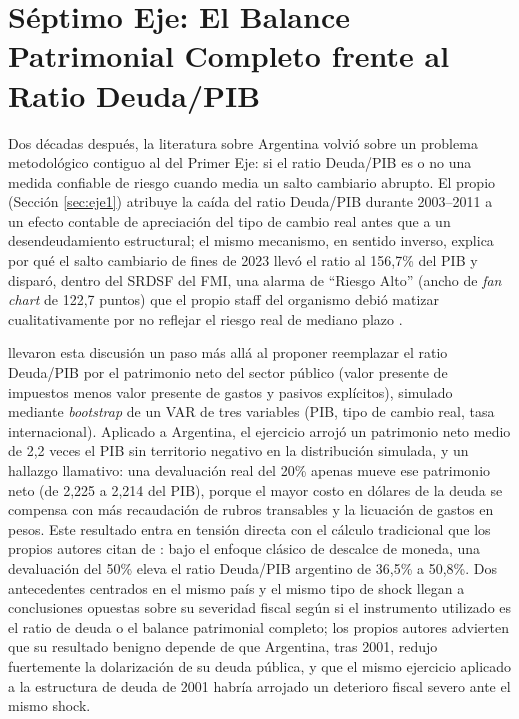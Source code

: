 \section{Séptimo Eje: El Balance Patrimonial Completo frente al Ratio Deuda/PIB}

Dos décadas después, la literatura sobre Argentina volvió sobre un problema metodológico contiguo al del Primer Eje: si el ratio Deuda/PIB es o no una medida confiable de riesgo cuando media un salto cambiario abrupto. El propio \citet{rodriguez2023} (Sección \ref{sec:eje1}) atribuye la caída del ratio Deuda/PIB durante 2003--2011 a un efecto contable de apreciación del tipo de cambio real antes que a un desendeudamiento estructural; el mismo mecanismo, en sentido inverso, explica por qué el salto cambiario de fines de 2023 llevó el ratio al 156,7\% del PIB y disparó, dentro del SRDSF del FMI, una alarma de ``Riesgo Alto'' (ancho de \textit{fan chart} de 122,7 puntos) que el propio staff del organismo debió matizar cualitativamente por no reflejar el riesgo real de mediano plazo \citep{imf2024}.

\citet{levyyeyati2021} llevaron esta discusión un paso más allá al proponer reemplazar el ratio Deuda/PIB por el patrimonio neto del sector público (valor presente de impuestos menos valor presente de gastos y pasivos explícitos), simulado mediante \textit{bootstrap} de un VAR de tres variables (PIB, tipo de cambio real, tasa internacional). Aplicado a Argentina, el ejercicio arrojó un patrimonio neto medio de 2,2 veces el PIB sin territorio negativo en la distribución simulada, y un hallazgo llamativo: una devaluación real del 20\% apenas mueve ese patrimonio neto (de 2,225 a 2,214 del PIB), porque el mayor costo en dólares de la deuda se compensa con más recaudación de rubros transables y la licuación de gastos en pesos. Este resultado entra en tensión directa con el cálculo tradicional que los propios autores citan de \citet{calvo2003}: bajo el enfoque clásico de descalce de moneda, una devaluación del 50\% eleva el ratio Deuda/PIB argentino de 36,5\% a 50,8\%. Dos antecedentes centrados en el mismo país y el mismo tipo de shock llegan a conclusiones opuestas sobre su severidad fiscal según si el instrumento utilizado es el ratio de deuda o el balance patrimonial completo; los propios autores advierten que su resultado benigno depende de que Argentina, tras 2001, redujo fuertemente la dolarización de su deuda pública, y que el mismo ejercicio aplicado a la estructura de deuda de 2001 habría arrojado un deterioro fiscal severo ante el mismo shock.

